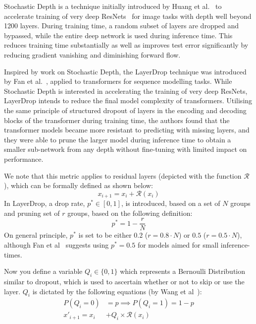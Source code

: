 \documentclass[12pt]{article}
\begin{document}
{Stochastic Depth is a technique initially introduced by Huang et al.~\cite{stochasticdepth} to accelerate training of very deep ResNets~\cite{resnet} for image tasks with depth well beyond 1200 layers. During training time, a random subset of layers are dropped and bypassed, while the entire deep network is used during inference time. This reduces training time substantially as well as improves test error significantly by reducing gradient vanishing and diminishing forward flow. 

Inspired by work on Stochastic Depth, the LayerDrop technique was introduced by Fan et al.~\cite{layerdrop}, applied to transformers for sequence modelling tasks. While Stochastic Depth is interested in accelerating the training of very deep ResNets, LayerDrop intends to reduce the final model complexity of transformers. Utilising the same principle of structured dropout of layers in the encoding and decoding blocks of the transformer during training time, the authors found that the transformer models became more resistant to predicting with missing layers, and they were able to prune the larger model during inference time to obtain a smaller sub-network from any depth without fine-tuning with limited impact on performance.

We note that this metric applies to residual layers (depicted with the function $\mathcal{R}$), which can be formally defined as shown below:
\[ x_{i+1} = x_i + \mathcal{R}(x_i) \]
In LayerDrop, a drop rate, $p^* \in [0, 1]$, is introduced, based on a set of $N$ groups and pruning set of $r$ groups, based on the following definition:
\[ p^* = 1 - \frac{r}{N} \]
On general principle, $p^*$ is set to be either $0.2$ ($r = 0.8 \cdot N$) or $0.5$ ($r = 0.5 \cdot N$), although Fan et al~\cite{layerdrop} suggests using $p^* = 0.5$ for models aimed for small inference-times.

Now you define a variable $Q_i \in \{0, 1\}$ which represents a Bernoulli Distribution similar to dropout, which is used to ascertain whether or not to skip or use the layer. $Q_i$ is dictated by the following equations (by Wang et al~\cite{layerdrop2}):
\begin{align*}
    P(Q_i = 0) &= p \implies P(Q_i = 1) = 1 - p \\
    x'_{i+1} = x_i &+ Q_i \times \mathcal{R}(x_i)
\end{align*}

}
\end{document}
